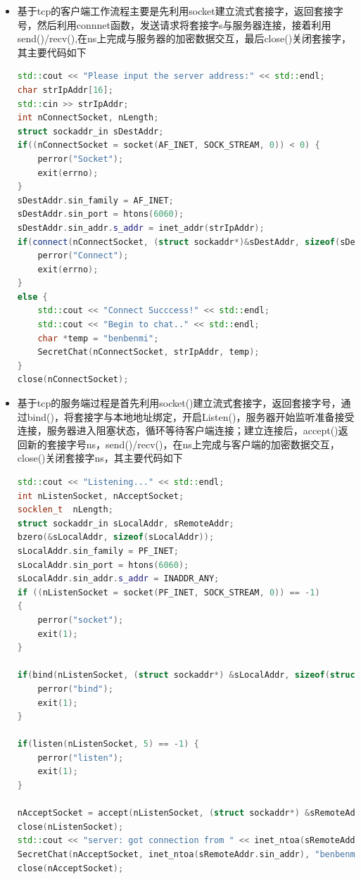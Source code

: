 \documentclass[UTF8,a4paper,10pt]{ctexart}
\begin{document}
\begin{itemize}
\begin{lstlisting}[language = c++]
    return SUCCESS;
}
  \end{lstlisting}
  \item 基于tcp的客户端工作流程主要是先利用socket建立流式套接字，返回套接字号，然后利用connnet函数，发送请求将套接字s与服务器连接，接着利用send()/recv(),在ns上完成与服务器的加密数据交互，最后close()关闭套接字，其主要代码如下
  \begin{lstlisting}[language = c++]
std::cout << "Please input the server address:" << std::endl;
char strIpAddr[16];
std::cin >> strIpAddr;
int nConnectSocket, nLength;
struct sockaddr_in sDestAddr;
if((nConnectSocket = socket(AF_INET, SOCK_STREAM, 0)) < 0) {
    perror("Socket");
    exit(errno);
}
sDestAddr.sin_family = AF_INET;
sDestAddr.sin_port = htons(6060);
sDestAddr.sin_addr.s_addr = inet_addr(strIpAddr);
if(connect(nConnectSocket, (struct sockaddr*)&sDestAddr, sizeof(sDestAddr)) != 0) {
    perror("Connect");
    exit(errno);
}
else {
    std::cout << "Connect Succcess!" << std::endl;
    std::cout << "Begin to chat.." << std::endl;
    char *temp = "benbenmi";
    SecretChat(nConnectSocket, strIpAddr, temp);
}
close(nConnectSocket);
  \end{lstlisting}
  \item 基于tcp的服务端过程是首先利用socket()建立流式套接字，返回套接字号，通过bind()，将套接字与本地地址绑定，开启Listen()，服务器开始监听准备接受连接，服务器进入阻塞状态，循环等待客户端连接；建立连接后，accept()返回新的套接字号ns，send()/recv()，在ns上完成与客户端的加密数据交互，close()关闭套接字ns，其主要代码如下
  \begin{lstlisting}[language = c++]
std::cout << "Listening..." << std::endl;
int nListenSocket, nAcceptSocket;
socklen_t  nLength;
struct sockaddr_in sLocalAddr, sRemoteAddr;
bzero(&sLocalAddr, sizeof(sLocalAddr));
sLocalAddr.sin_family = PF_INET;
sLocalAddr.sin_port = htons(6060);
sLocalAddr.sin_addr.s_addr = INADDR_ANY;
if ((nListenSocket = socket(PF_INET, SOCK_STREAM, 0)) == -1)
{
    perror("socket");
    exit(1);
}

if(bind(nListenSocket, (struct sockaddr*) &sLocalAddr, sizeof(struct sockaddr)) == -1) {
    perror("bind");
    exit(1);
}

if(listen(nListenSocket, 5) == -1) {
    perror("listen");
    exit(1);
}

nAcceptSocket = accept(nListenSocket, (struct sockaddr*) &sRemoteAddr, &nLength);
close(nListenSocket);
std::cout << "server: got connection from " << inet_ntoa(sRemoteAddr.sin_addr) << ", port " << ntohs(sRemoteAddr.sin_port) << ", socket " << nAcceptSocket << std::endl;
SecretChat(nAcceptSocket, inet_ntoa(sRemoteAddr.sin_addr), "benbenmi");
close(nAcceptSocket);
  \end{lstlisting}
\end{itemize}
\end{document}
